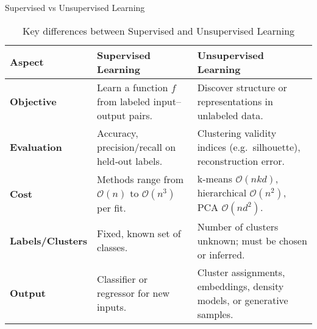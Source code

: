 \begin{frame}[fragile]{Supervised vs Unsupervised Learning}
  \scriptsize  %
  \begin{table}[h!]
    \centering
    \begin{tabular}{|p{2cm}|p{3cm}|p{3cm}|}
      \hline
      \textbf{Aspect}        & \textbf{Supervised Learning}                                              & \textbf{Unsupervised Learning}                                                                  \\
      \hline
      \textbf{Objective}     & Learn a function \(f\) from labeled input–output pairs.                  & Discover structure or representations in unlabeled data.                                          \\
      \hline
      \textbf{Evaluation}    & Accuracy, precision/recall on held‑out labels.                           & Clustering validity indices (e.g.\ silhouette), reconstruction error.                             \\
      \hline
      \textbf{Cost}          & Methods range from \(\mathcal O(n)\) to \(\mathcal O(n^3)\) per fit.     & k‑means \(\mathcal O(nkd)\), hierarchical \(\mathcal O(n^2)\), PCA \(\mathcal O(nd^2)\).         \\
      \hline
      \textbf{Labels/Clusters} & Fixed, known set of classes.                                           & Number of clusters unknown; must be chosen or inferred.                                           \\
      \hline
      \textbf{Output}        & Classifier or regressor for new inputs.                                  & Cluster assignments, embeddings, density models, or generative samples.                           \\
      \hline
    \end{tabular}
    \caption*{Key differences between Supervised and Unsupervised Learning}
  \end{table}
\end{frame}

